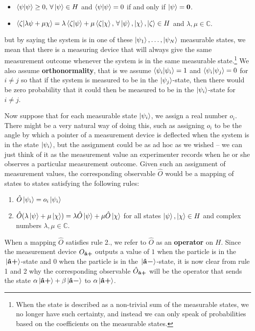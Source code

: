 {\begin{itemize}[topsep=0pt]
\item $\ip{\psi}{\psi}\geq 0,\, \forall \ket{\psi}\in H$ and $\ip{\psi}{\psi}=0$ if and only if $\ket{\psi}=\bm{0}$.
\item $\ip{\zeta}{\lambda\psi+\mu\chi}=\lambda\ip{\zeta}{\psi}+\mu\ip{\zeta}{\chi},\,\forall \ket{\psi},\ket{\chi},\ket{\zeta}\in H$ and  $\lambda,\mu\in\mathbb{C}$.
\end{itemize}} but by saying the system is in one of these $\ket{\psi_1},\ldots,\ket{\psi_N}$ measurable states, we mean that there is a measuring device that will always give the same measurement outcome whenever the system is in the same measurable state.\footnote{When the state is described as a non-trivial sum of the measurable states, we no longer have such certainty, and instead we can only speak of probabilities based on the coefficients on the measurable states.} We also assume \textbf{orthonormality}, that is we assume $\ip{\psi_i}{\psi_i}=1$ and $\ip{\psi_i}{\psi_j}=0$ for $i\neq j$ so that if the system is measured to be in the $\ket{\psi_j}$-state, then there would be zero probability that it could then be measured to be in the $\ket{\psi_i}$-state for $i\neq j$.  

Now suppose that for each measurable state $\ket{\psi_i}$, we assign a real number $o_i$.  There might be a very natural way of doing this, such as assigning  $o_i$ to be the angle by which a pointer of a measurement device is deflected when the system is in the state $\ket{\psi_i}$, but the assignment could be as ad hoc as we wished – we can just think of it as the measurement value an experimenter records when he or she observes a particular measurement outcome. Given such an assignment of measurement values, the corresponding observable $\hat{O}$ would be a mapping of states to states satisfying the following rules:
\begin{enumerate}[noitemsep, nosep, topsep=0pt]
\item $\hat{O}\ket{\psi_i}=o_i\ket{\psi_i}$
\item $\hat{O}(\lambda\ket{\psi}+\mu\ket{\chi})=\lambda\hat{O}\ket{\psi}+\mu\hat{O}\ket{\chi}$  for all states $\ket{\psi},\ket{\chi}\in H$ and complex numbers $\lambda,\mu\in\mathbb{C}$.
\end{enumerate}
When a mapping $\hat{O}$ satisfies rule 2., we refer to $\hat{O}$ as an \textbf{operator} on $H$. Since the measurement device $O_{\vb{\hat{{a}}}\bm{+}}$ outputs a value of $1$ when the particle is in the $\ket*{\vb{\hat{{a}}}\bm{+}}$-state and $0$ when the particle is in the $\ket*{\vb{\hat{{a}}}\bm{-}}$-state, it is now clear from rule 1 and 2 why the corresponding observable $\hat{O}_{\vb{\hat{{a}}}\bm{+}}$ will be the operator that sends the state $\alpha\ket*{\vb{\hat{{a}}}\bm{+}}+\beta\ket*{\vb{\hat{{a}}}\bm{-}}$ to $\alpha\ket*{\vb{\hat{{a}}}\bm{+}}$.

